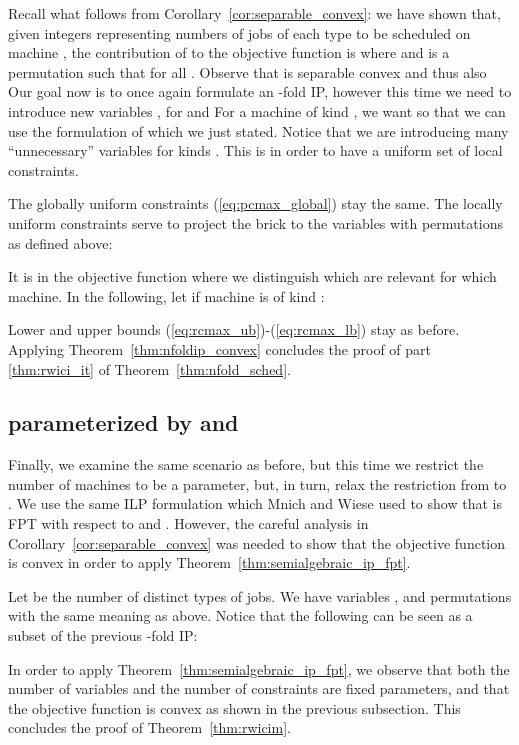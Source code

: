 \documentclass{llncs}
\newcommand{\FPT}{{\sf FPT}\xspace}
\begin{document}
Recall what follows from Corollary~\ref{cor:separable_convex}: we have shown that, given integers  representing numbers of jobs of each type to be scheduled on machine , the contribution of  to the objective function is   where  and  is a permutation such that  for all .
Observe that  is separable convex and thus also  
Our goal now is to once again formulate an -fold IP, however this time we need to introduce new variables , for  and  For a machine  of kind , we want  so that we can use the formulation of  which we just stated. Notice that we are introducing many ``unnecessary'' variables  for kinds . This is in order to have a uniform set of local constraints.

The globally uniform constraints (\ref{eq:pcmax_global}) stay the same. The locally uniform constraints serve to project the brick  to the variables  with permutations  as defined above:


It is in the objective function where we distinguish which  are relevant for which machine. In the following, let  if machine  is of kind :


Lower and upper bounds (\ref{eq:rcmax_ub})-(\ref{eq:rcmax_lb}) stay as before. Applying Theorem~\ref{thm:nfoldip_convex} concludes the proof of part \eqref{thm:rwici_it} of Theorem~\ref{thm:nfold_sched}.

\subsection{ parameterized by  and }

Finally, we examine the same scenario as before, but this time we restrict the number of machines  to be a parameter, but, in turn, relax the restriction from  to . We use the same ILP formulation which Mnich and Wiese used to show that  is \FPT with respect to  and . However, the careful analysis in Corollary~\ref{cor:separable_convex} was needed to show that the objective function is convex in order to apply Theorem~\ref{thm:semialgebraic_ip_fpt}.

Let  be the number of distinct types of jobs. We have variables ,  and permutations  with the same meaning as above. Notice that the following can be seen as a subset of the previous -fold IP:


In order to apply Theorem~\ref{thm:semialgebraic_ip_fpt}, we observe that both the number of variables  and the number of constraints  are fixed parameters, and that the objective function  is convex as shown in the previous subsection. This concludes the proof of Theorem~\ref{thm:rwicim}.
\end{document}
